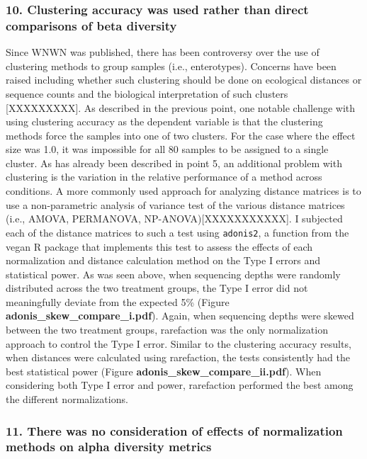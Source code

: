 \documentclass[
]{article}
\begin{document}
\hypertarget{clustering-accuracy-was-used-rather-than-direct-comparisons-of-beta-diversity}{%
\subsubsection{10. Clustering accuracy was used rather than direct
comparisons of beta
diversity}\label{clustering-accuracy-was-used-rather-than-direct-comparisons-of-beta-diversity}}

Since WNWN was published, there has been controversy over the use of
clustering methods to group samples (i.e., enterotypes). Concerns have
been raised including whether such clustering should be done on
ecological distances or sequence counts and the biological
interpretation of such clusters {[}XXXXXXXXX{]}. As described in the
previous point, one notable challenge with using clustering accuracy as
the dependent variable is that the clustering methods force the samples
into one of two clusters. For the case where the effect size was 1.0, it
was impossible for all 80 samples to be assigned to a single cluster. As
has already been described in point 5, an additional problem with
clustering is the variation in the relative performance of a method
across conditions. A more commonly used approach for analyzing distance
matrices is to use a non-parametric analysis of variance test of the
various distance matrices (i.e., AMOVA, PERMANOVA,
NP-ANOVA){[}XXXXXXXXXXX{]}. I subjected each of the distance matrices to
such a test using \texttt{adonis2}, a function from the vegan R package
that implements this test to assess the effects of each normalization
and distance calculation method on the Type I errors and statistical
power. As was seen above, when sequencing depths were randomly
distributed across the two treatment groups, the Type I error did not
meaningfully deviate from the expected 5\% (Figure
\textbf{adonis\_skew\_compare\_i.pdf}). Again, when sequencing depths
were skewed between the two treatment groups, rarefaction was the only
normalization approach to control the Type I error. Similar to the
clustering accuracy results, when distances were calculated using
rarefaction, the tests consistently had the best statistical power
(Figure \textbf{adonis\_skew\_compare\_ii.pdf}). When considering both
Type I error and power, rarefaction performed the best among the
different normalizations.

\hypertarget{there-was-no-consideration-of-effects-of-normalization-methods-on-alpha-diversity-metrics}{%
\subsubsection{11. There was no consideration of effects of
normalization methods on alpha diversity
metrics}\label{there-was-no-consideration-of-effects-of-normalization-methods-on-alpha-diversity-metrics}}
\end{document}
